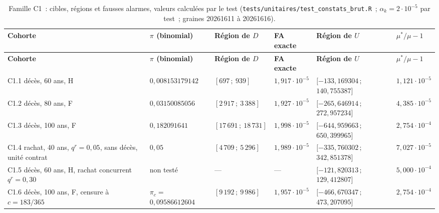 \documentclass[a4paper,11pt]{article}
\newcommand{\code}[1]{\texttt{\small #1}}
\begin{document}
{\small
{}
\begin{longtable}{@{}p{2.3cm}p{2.5cm}p{2.4cm}p{1.7cm}p{2.6cm}p{1.7cm}@{}}
\caption{Famille C1~: cibles, régions et fausses alarmes, valeurs calculées
par le test (\code{tests/unitaires/test\_constats\_brut.R}~; $\alpha_k = 2
\cdot 10^{-5}$ par test~; graines 20261611 à 20261616).}
\label{tab:constats-c1}\\
\rowcolor{tableheader}
\textcolor{financeblue}{\textbf{Cohorte}} &
\textcolor{financeblue}{\textbf{$\pi$ (binomial)}} &
\textcolor{financeblue}{\textbf{Région de $D$}} &
\textcolor{financeblue}{\textbf{FA exacte}} &
\textcolor{financeblue}{\textbf{Région de $U$}} &
\textcolor{financeblue}{\textbf{$\mu^{*}/\mu - 1$}} \\
\endfirsthead
\rowcolor{tableheader}
\textcolor{financeblue}{\textbf{Cohorte}} &
\textcolor{financeblue}{\textbf{$\pi$ (binomial)}} &
\textcolor{financeblue}{\textbf{Région de $D$}} &
\textcolor{financeblue}{\textbf{FA exacte}} &
\textcolor{financeblue}{\textbf{Région de $U$}} &
\textcolor{financeblue}{\textbf{$\mu^{*}/\mu - 1$}} \\
\endhead
C1.1 décès, 60 ans, H & $0{,}008153179142$ & $[697\,;\ 939]$ & $1{,}917 \cdot 10^{-5}$ & $[-133{,}169304\,;$\newline $140{,}755387]$ & $1{,}121 \cdot 10^{-5}$ \\
C1.2 décès, 80 ans, F & $0{,}03150085056$ & $[2\,917\,;\ 3\,388]$ & $1{,}927 \cdot 10^{-5}$ & $[-265{,}646914\,;$\newline $272{,}957234]$ & $4{,}385 \cdot 10^{-5}$ \\
C1.3 décès, 100 ans, F & $0{,}182091641$ & $[17\,691\,;\ 18\,731]$ & $1{,}998 \cdot 10^{-5}$ & $[-644{,}959663\,;$\newline $650{,}399965]$ & $2{,}754 \cdot 10^{-4}$ \\
C1.4 rachat, 40 ans, $q^r = 0{,}05$, sans décès, unité contrat & $0{,}05$ & $[4\,709\,;\ 5\,296]$ & $1{,}989 \cdot 10^{-5}$ & $[-335{,}760302\,;$\newline $342{,}851378]$ & $7{,}027 \cdot 10^{-5}$ \\
C1.5 décès, 60 ans, H, rachat concurrent $q^r = 0{,}30$ & non testé & --- & --- & $[-121{,}820313\,;$\newline $129{,}412807]$ & $5{,}000 \cdot 10^{-4}$ \\
C1.6 décès, 100 ans, F, censure à $c = 183/365$ & $\pi_c =$\newline $0{,}09586612604$ & $[9\,192\,;\ 9\,986]$ & $1{,}957 \cdot 10^{-5}$ & $[-466{,}670347\,;$\newline $473{,}207095]$ & $2{,}754 \cdot 10^{-4}$ \\
\end{longtable}
}
\end{document}
